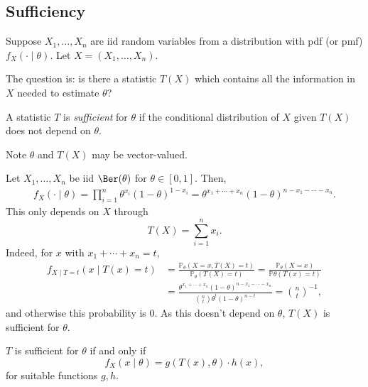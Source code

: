 \documentclass[12pt]{article}
\begin{document}
\subsection{Sufficiency}
\label{sub:sufficiency}

Suppose $X_1, \ldots, X_n$ are iid random variables from a distribution with pdf (or pmf) $f_X(\cdot \mid \theta)$. Let $X = (X_1, \ldots, X_n)$.

The question is: is there a statistic $T(X)$ which contains all the information in $X$ needed to estimate $\theta$?

\begin{definition}
	A statistic $T$ is \emph{sufficient} for $\theta$ if the conditional distribution of $X$ given $T(X)$ does not depend on $\theta$.
\end{definition}

Note $\theta$ and $T(X)$ may be vector-valued.

\begin{exbox}
	Let $X_1, \ldots, X_n$ be iid $\Ber(\theta)$ for $\theta \in [0,1]$. Then,
	\begin{align*}
		f_X(\cdot \mid \theta) = \prod_{i = 1}^{n} \theta^{x_i} (1 - \theta)^{1 - x_i} = \theta^{x_1 + \cdots + x_n}(1 - \theta)^{n - x_1 - \cdots - x_n}.
	\end{align*}
	This only depends on $X$ through
	 \[
	T(X) = \sum_{i = 1}^{n} x_i
	.\]
	Indeed, for $x$ with $x_1 + \cdots + x_n = t$,
	\begin{align*}
		f_{X \mid T = t}(x \mid T(x) = t) &= \frac{\mathbb{P}_\theta(X = x, T(X) = t)}{\mathbb{P}_\theta(T(X) = t)} = \frac{\mathbb{P}_\theta(X=x)}{\mathbb{P}\theta(T(x) = t)} \\
						  &= \frac{\theta^{x_1 + \cdots + x_n}(1 - \theta)^{n - x_1 - \cdots - x_n}}{\binom{n}{t}\theta^{t}(1 - \theta)^{n-t}} = \binom{n}{t}^{-1},
	\end{align*}
	and otherwise this probability is $0$. As this doesn't depend on $\theta$, $T(X)$ is sufficient for $\theta$.
\end{exbox}

\begin{theorem}
	$T$ is sufficient for $\theta$ if and only if
	\[
	f_X(x \mid \theta) = g(T(x), \theta) \cdot h(x)
	,\]
	for suitable functions $g, h$.
\end{theorem}
\end{document}
